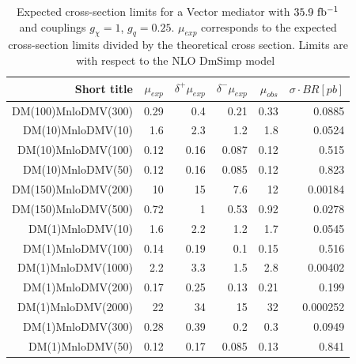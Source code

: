 \begin{table}[hbtp]
  \caption{Expected cross-section limits for a Vector mediator with $35.9~\mathrm{fb^{-1}}$ and couplings $g_\chi=1$, $g_q=0.25$.
  $\mu_{exp}$ corresponds to the expected cross-section limits divided by the theoretical cross section. Limits are with respect to the NLO {\textsc DmSimp} model~\cite{Neubert:2015fka,Backovic:2015soa}}
  \label{tab:vector_limits}
  \begin{center}
{\footnotesize
  \begin{tabular}{rrrrrr}
\hline 
Short title               & $\mu_{exp}$  & $\delta^{+}\mu_{exp}$ & $\delta^{-}\mu_{exp}$ & $\mu_{obs}$  & $\sigma \cdot BR [pb]$ \\
\hline
DM(100)MnloDMV(300)       & 0.29         & 0.4          & 0.21         & 0.33         & 0.0885          \\
DM(10)MnloDMV(10)         & 1.6          & 2.3          & 1.2          & 1.8          & 0.0524          \\
DM(10)MnloDMV(100)        & 0.12         & 0.16         & 0.087        & 0.12         & 0.515           \\
DM(10)MnloDMV(50)         & 0.12         & 0.16         & 0.085        & 0.12         & 0.823           \\
DM(150)MnloDMV(200)       & 10           & 15           & 7.6          & 12           & 0.00184         \\
DM(150)MnloDMV(500)       & 0.72         & 1            & 0.53         & 0.92         & 0.0278          \\
DM(1)MnloDMV(10)          & 1.6          & 2.2          & 1.2          & 1.7          & 0.0545          \\
DM(1)MnloDMV(100)         & 0.14         & 0.19         & 0.1          & 0.15         & 0.516           \\
DM(1)MnloDMV(1000)        & 2.2          & 3.3          & 1.5          & 2.8          & 0.00402         \\
DM(1)MnloDMV(200)         & 0.17         & 0.25         & 0.13         & 0.21         & 0.199           \\
DM(1)MnloDMV(2000)        & 22           & 34           & 15           & 32           & 0.000252        \\
DM(1)MnloDMV(300)         & 0.28         & 0.39         & 0.2          & 0.3          & 0.0949          \\
DM(1)MnloDMV(50)          & 0.12         & 0.17         & 0.085        & 0.13         & 0.841           \\

\end{tabular}}
\end{center}
\end{table}

